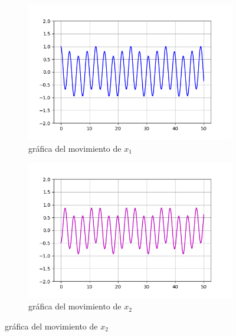\documentclass{article}
\begin{document}
\begin{figure}[ht!]
	\begin{subfigure}[b]{0.5\linewidth}
    \raggedleft
	\includegraphics[width=\linewidth]{ejercicio31-x1.png}
    \caption{gráfica del movimiento de $x_1$}
	\end{subfigure}
	\begin{subfigure}[b]{0.5\linewidth}
    \raggedright
	\includegraphics[width=\linewidth]{ejercicio31-x2.png}
	\caption{gráfica del movimiento de $x_2$}
    \end{subfigure}
\end{figure}
\end{document}
